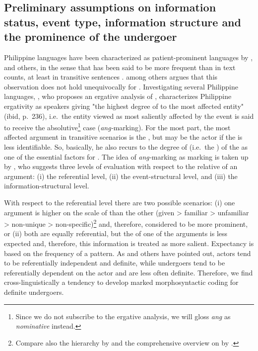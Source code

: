 \documentclass[output=paper,
,modfonts
,nonflat]{langsci/langscibook}
\begin{document}
\subsection{Preliminary assumptions on information status, event type, information structure and the prominence of the undergoer}\label{sect:pat_prom}

Philippine languages have been characterized as patient-prominent languages by \cite{cenre77}, \cite{guzvi92} and others, in the sense that  has been said to be more frequent than  in text counts, at least in transitive sentences \citep[cf.][]{payto94,selpe01}. \cite{macla02} among others argues that this observation does not hold unequivocally for . Investigating several Philippine languages, \cite{nolri05}, who proposes an ergative analysis of , characterizes Philippine ergativity as speakers giving "the highest degree of  to the most affected entity" (ibid, p.\ 236), i.e.\ the entity viewed as most saliently affected by the event is said to receive the absolutive\footnote{Since we do not subscribe to the ergative analysis, we will gloss \textit{ang} as \textit{nominative} instead.} case (\textit{ang-}marking). For the most part, the most affected argument in transitive scenarios is the , but may be the actor if the  is less identifiable. So, basically, he also recurs to the degree of  (i.e.\ the ) of the  as one of the essential factors for . The idea of \textit{ang-}marking as  marking is taken up by \cite{latan11}, who suggests three levels of evaluation with respect to the relative  of an argument: (i) the referential level, (ii) the event-structural level, and (iii) the information-structural level. 

With respect to the referential level there are two possible scenarios: (i) one argument is higher on the scale of  than the other (given > familiar > unfamiliar > non-unique > non-specific)\footnote{Compare also the  hierarchy by \cite{gunje93} and the comprehensive overview on  by \cite{baust12a}.} and, therefore, considered to be more prominent, or (ii) both are equally referential, but the  of one of the arguments is less expected and, therefore, this information is treated as more salient. Expectancy is based on the frequency of a pattern. As \cite{pribe12} and others have pointed out, actors tend to be referentially independent and definite, while undergoers tend to be referentially dependent on the actor and are less often definite. Therefore, we find cross-linguistically a tendency to develop marked morphosyntactic coding for definite undergoers.
\end{document}

